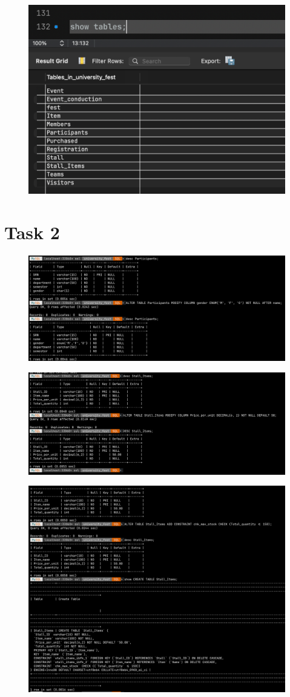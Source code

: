 \documentclass{article}
\begin{document}
\begin{figure}[H]
    \centering
    \includegraphics[width=0.7\linewidth]{images/task 1/14.png}
\end{figure}

\newpage

\section{Task 2}

\begin{figure}[H]
    \centering
    \includegraphics[width=0.7\linewidth]{images/task 2/1.png}
\end{figure}

\begin{figure}[H]
    \centering
    \includegraphics[width=0.7\linewidth]{images/task 2/2.png}
\end{figure}

\begin{figure}[H]
    \centering
    \includegraphics[width=0.7\linewidth]{images/task 2/3.png}
\end{figure}
\end{document}
